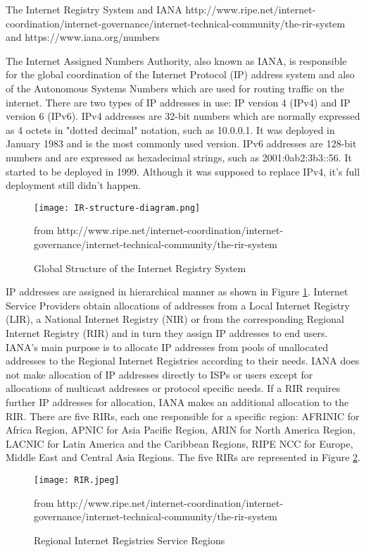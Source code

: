\documentclass[11pt]{report}
\begin{document}
The Internet Registry System and IANA http://www.ripe.net/internet-coordination/internet-governance/internet-technical-community/the-rir-system and https://www.iana.org/numbers

The Internet Assigned Numbers Authority, also known as IANA, is responsible for the global coordination of the Internet Protocol (IP) address system and also of the Autonomous Systems Numbers which are used for routing traffic on the internet. There are two types of IP addresses in use: IP version 4 (IPv4) and IP version 6 (IPv6). IPv4 addresses are 32-bit numbers which are normally expressed as 4 octets in "dotted decimal" notation, such as 10.0.0.1. It was deployed in January 1983 and is the most commonly used version. IPv6 addresses are 128-bit numbers and are expressed as hexadecimal strings, such as 2001:0ab2:3b3::56. It started to be deployed in 1999. Although it was supposed to replace IPv4, it's full deployment still didn't happen. 

\begin{figure}[h!]
\centering
\texttt{[image: IR-structure-diagram.png]}
\caption{Global Structure of the Internet Registry System}
from http://www.ripe.net/internet-coordination/internet-governance/internet-technical-community/the-rir-system
\label{fig:ir_structure_diagram}
\end{figure}

IP addresses are assigned in hierarchical manner as shown in Figure \ref{fig:ir_structure_diagram}. Internet Service Providers obtain allocations of addresses from a Local Internet Registry (LIR), a National Internet Registry (NIR) or from the corresponding Regional Internet Registry (RIR) and in turn they assign IP addresses to end users. IANA's main purpose is to allocate IP addresses from pools of unallocated addresses to the Regional Internet Registries according to their needs. IANA does not make allocation of IP addresses directly to ISPs or users except for allocations of multicast addresses or protocol specific needs. If a RIR requires further IP addresses for allocation, IANA makes an additional allocation to the RIR. There are five RIRs, each one responsible for a specific region: AFRINIC for Africa Region, APNIC for Asia Pacific Region, ARIN for North America Region, LACNIC for Latin America and the Caribbean Regions, RIPE NCC for Europe, Middle East and Central Asia Regions. The five RIRs are represented in Figure \ref{fig:rirs_image}.

\begin{figure}[h!]
\centering
\texttt{[image: RIR.jpeg]}
\caption{Regional Internet Registries Service Regions}
from http://www.ripe.net/internet-coordination/internet-governance/internet-technical-community/the-rir-system
\label{fig:rirs_image}
\end{figure}
\end{document}
